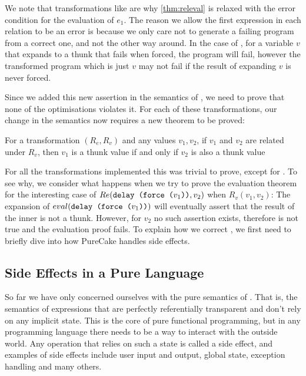 We note that transformations like  are why
\autoref{thm:releval} is relaxed with the error condition for the evaluation of
$e_1$. The reason we allow the first expression in each relation to be an error
is because we only care not to generate a failing program from a correct one,
and not the other way around. In the case of , for a variable
$v$ that expands to a thunk that fails when forced, the program  will fail, however the transformed program which is just $v$ may
not fail if the result of expanding $v$ is never forced.

Since we added this new assertion in the semantics of , we need to
prove that none of the optimisations violates it. For each of these
transformations, our change in the semantics now requires a new theorem to be
proved:

\begin{theorem} For a transformation $(R_e,R_v)$ and any
values $v_1,v_2$, if $v_1$ and $v_2$ are related under $R_v$, then $v_1$ is a
thunk value if and only if $v_2$ is also a thunk value
\end{theorem}

For all the transformations implemented this was trivial to prove, except for
. To see why, we consider what happens when we try to prove
the evaluation theorem for the interesting case of $Re(\texttt{delay (force
($v_1$))}, v_2)$ when $R_v(v_1,v_2)$: The expansion of $eval(\texttt{delay (force
($v_1$))})$ will eventually assert that the result of the inner  is
not a thunk. However, for $v_2$ no such assertion exists, therefore
\textbf{} is not true and the evaluation proof fails. To
explain how we correct , we first need to briefly dive into
how PureCake handles side effects.

\subsection {Side Effects in a Pure Language}

So far we have only concerned ourselves with the pure semantics of \ThunkLang{}.
That is, the semantics of expressions that are perfectly
referentially transparent and don't rely on any implicit state. This is the core
of pure functional programming, but in any programming language there needs to
be a way to interact with the outside world. Any operation that relies on such a
state is called a side effect, and examples of side effects include user input
and output, global state, exception handling and many others.

